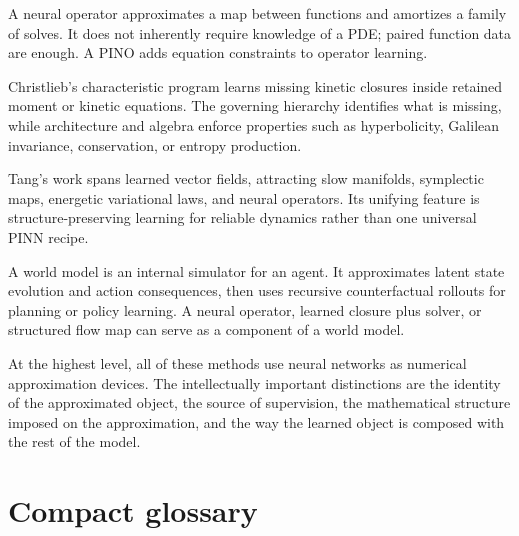 \documentclass[11pt]{article}
\begin{document}
\begin{takeaway}
A neural operator approximates a map between functions and amortizes a family of solves. It does not inherently require knowledge of a PDE; paired function data are enough. A PINO adds equation constraints to operator learning.
\end{takeaway}

\begin{takeaway}[Christlieb]
Christlieb's characteristic program learns missing kinetic closures inside retained moment or kinetic equations. The governing hierarchy identifies what is missing, while architecture and algebra enforce properties such as hyperbolicity, Galilean invariance, conservation, or entropy production.
\end{takeaway}

\begin{takeaway}[Tang]
Tang's work spans learned vector fields, attracting slow manifolds, symplectic maps, energetic variational laws, and neural operators. Its unifying feature is structure-preserving learning for reliable dynamics rather than one universal PINN recipe.
\end{takeaway}

\begin{takeaway}
A world model is an internal simulator for an agent. It approximates latent state evolution and action consequences, then uses recursive counterfactual rollouts for planning or policy learning. A neural operator, learned closure plus solver, or structured flow map can serve as a component of a world model.
\end{takeaway}

At the highest level, all of these methods use neural networks as numerical approximation devices. The intellectually important distinctions are the identity of the approximated object, the source of supervision, the mathematical structure imposed on the approximation, and the way the learned object is composed with the rest of the model.

\appendix

\section{Compact glossary}
\end{document}

